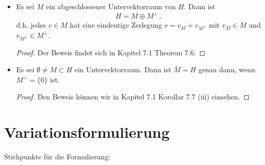 \begin{itemize}
\item \begin{satz}
 Es sei $M$ ein abgeschlossener Untervektorraum von $H$. Dann ist
  \[
  	H=M\oplus M^\perp\, , 
  \]
  d.h. jedes $v\in M$ hat eine eindeutige Zerlegung $v=v_M+v_{M^\perp}$ mit $v_M\in M$ und $v_{M^\perp}\in M^\perp$.
\end{satz}

\begin{proof}
Der Beweis findet sich in \cite{Walker} Kapitel 7.1 Theorem 7.6.
\end{proof}

\item \begin{kor}\label{kor:2.6}
Es sei $\emptyset \not = M \subset H$   ein Untervektorraum. Dann ist $\bar M = H$ genau dann, wenn $M^\perp = \{0\}$ ist.
\end{kor}

\begin{proof}
Den Beweis können wir in \cite{Walker} Kapitel 7.1 Korollar 7.7 (iii) einsehen.
\end{proof}
\end{itemize}
 

\section{Variationsformulierung}


Stichpunkte für die Formulierung:

